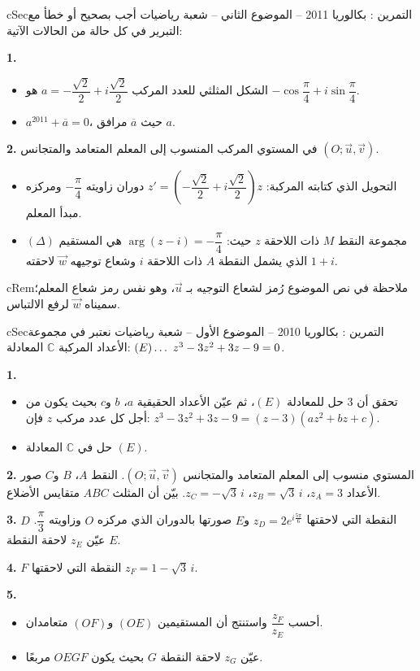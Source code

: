 \documentclass[12pt,a4paper]{article}
\newenvironment{BOX}[2]{\begin{otherlanguage}{english}\begin{arbox}{#1}{#2}}{\end{arbox}\end{otherlanguage}}
\newenvironment{molahada}[1][ملاحظة]{\begin{BOX}{cRem}{#1}}{\end{BOX}}
\newcounter{exo}
\newenvironment{tamrin}[1]{\stepcounter{exo}\begin{BOX}{cSec}{التمرين \theexo: #1}}{\end{BOX}}
\renewcommand{\ldots}{\mathinner{\ldotp\ldotp\ldotp}}
\newenvironment{sq}{\begin{itemize}[leftmargin=2.4em,itemsep=3pt]}{\end{itemize}}
\newcommand{\qa}{\item[(أ)]}\newcommand{\qb}{\item[(ب)]}\newcommand{\qc}{\item[(جـ)]}\newcommand{\qd}{\item[(د)]}\newcommand{\qe}{\item[(هـ)]}
\newcommand{\QQ}[1]{\par\smallskip\textbf{#1.} }
\begin{document}
\begin{tamrin}{بكالوريا 2011 -- الموضوع الثاني -- شعبة رياضيات}
أجب بصحيح أو خطأ مع التبرير في كل حالة من الحالات الآتية:
\QQ{1}
\begin{sq}
\qa الشكل المثلثي للعدد المركب $a=-\dfrac{\sqrt2}{2}+i\dfrac{\sqrt2}{2}$ هو $-\cos\dfrac{\pi}{4}+i\sin\dfrac{\pi}{4}$.
\qb $a^{2011}+\overline a=0$، حيث $\overline a$ مرافق $a$.
\end{sq}
\QQ{2} في المستوي المركب المنسوب إلى المعلم المتعامد والمتجانس $(O;\vec u,\vec v)$.
\begin{sq}
\qa التحويل الذي كتابته المركبة: $z'=\left(-\dfrac{\sqrt2}{2}+i\dfrac{\sqrt2}{2}\right)z$ دوران زاويته $-\dfrac{\pi}{4}$ ومركزه مبدأ المعلم.
\qb مجموعة النقط $M$ ذات اللاحقة $z$ حيث: $\arg(z-i)=-\dfrac{\pi}{4}$ هي المستقيم $(\Delta)$ الذي يشمل النقطة $A$ ذات اللاحقة $i$ وشعاع توجيهه $\vec w$ لاحقته $1+i$.
\end{sq}
\end{tamrin}
\begin{molahada}
في نص الموضوع رُمز لشعاع التوجيه بـ $\vec u$، وهو نفس رمز شعاع المعلم؛ سميناه $\vec w$ لرفع الالتباس.
\end{molahada}

\begin{tamrin}{بكالوريا 2010 -- الموضوع الأول -- شعبة رياضيات}
نعتبر في مجموعة الأعداد المركبة $\mathbb C$ المعادلة: $(E)\ldots\ z^3-3z^2+3z-9=0$.
\QQ{1}
\begin{sq}
\qa تحقق أن $3$ حل للمعادلة $(E)$، ثم عيّن الأعداد الحقيقية $a$، $b$ و$c$ بحيث يكون من أجل كل عدد مركب $z$ فإن: $z^3-3z^2+3z-9=(z-3)(az^2+bz+c)$.
\qb حل في $\mathbb C$ المعادلة $(E)$.
\end{sq}
\QQ{2} المستوي منسوب إلى المعلم المتعامد والمتجانس $(O;\vec u,\vec v)$. النقط $A$، $B$ و$C$ صور الأعداد $z_A=3$، $z_B=\sqrt3\,i$، $z_C=-\sqrt3\,i$. بيّن أن المثلث $ABC$ متقايس الأضلاع.
\QQ{3} $D$ النقطة التي لاحقتها $z_D=2e^{i\frac{5\pi}{6}}$ و$E$ صورتها بالدوران الذي مركزه $O$ وزاويته $\dfrac{\pi}{3}$. عيّن $z_E$ لاحقة النقطة $E$.
\QQ{4} $F$ النقطة التي لاحقتها $z_F=1-\sqrt3\,i$.
\QQ{5}
\begin{sq}
\qa أحسب $\dfrac{z_F}{z_E}$ واستنتج أن المستقيمين $(OE)$ و$(OF)$ متعامدان.
\qb عيّن $z_G$ لاحقة النقطة $G$ بحيث يكون $OEGF$ مربعًا.
\end{sq}
\end{tamrin}
\end{document}
